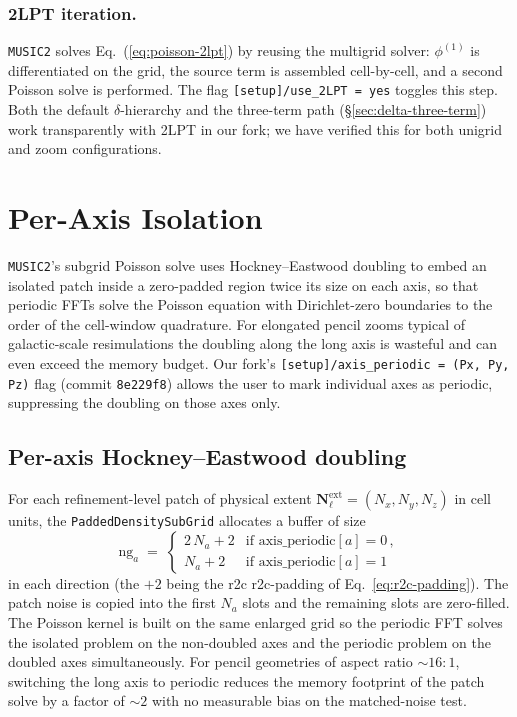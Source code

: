 \documentclass[12pt]{article}
\newcommand{\bN}{\mathbf{N}}
\newcommand{\code}[1]{\texttt{#1}}
\begin{document}
\subsubsection*{2LPT iteration.}
\texttt{MUSIC2} solves Eq.~(\ref{eq:poisson-2lpt}) by reusing the
multigrid solver: $\phi^{(1)}$ is differentiated on the grid, the
source term is assembled cell-by-cell, and a second Poisson solve
is performed.  The flag \code{[setup]/use\_2LPT = yes} toggles this
step.  Both the default $\delta$-hierarchy and the three-term path
(\S\ref{sec:delta-three-term}) work transparently with 2LPT in our
fork; we have verified this for both unigrid and zoom configurations.

\section{Per-Axis Isolation}
\label{sec:peraxis}

\texttt{MUSIC2}'s subgrid Poisson solve uses Hockney--Eastwood
doubling \citep{HockneyEastwood1988} to embed an isolated patch
inside a zero-padded region twice its size on each axis, so that
periodic FFTs solve the Poisson equation with Dirichlet-zero
boundaries to the order of the cell-window quadrature.  For
elongated pencil zooms typical of galactic-scale resimulations the
doubling along the long axis is wasteful and can even exceed the
memory budget.  Our fork's
\code{[setup]/axis\_periodic = (Px, Py, Pz)} flag (commit
\texttt{8e229f8}) allows the user to mark individual axes as
periodic, suppressing the doubling on those axes only.

\subsection{Per-axis Hockney--Eastwood doubling}
\label{sec:peraxis-doubling}

For each refinement-level patch of physical extent
$\bN^\mathrm{ext}_\ell = (N_x, N_y, N_z)$ in cell units, the
\code{PaddedDensitySubGrid} allocates a buffer of size
\begin{equation}
  \mathrm{ng}_a \;=\; \begin{cases}
                       2\,N_a + 2 & \text{if } \mathrm{axis\_periodic}[a] = 0\,, \\
                       N_a + 2    & \text{if } \mathrm{axis\_periodic}[a] = 1
                     \end{cases}
  \label{eq:axis-pad}
\end{equation}
in each direction (the $+2$ being the r2c r2c-padding of
Eq.~\ref{eq:r2c-padding}).  The patch noise is copied into the
first $N_a$ slots and the remaining slots are zero-filled.  The
Poisson kernel is built on the same enlarged grid so the periodic
FFT solves the isolated problem on the non-doubled axes and the
periodic problem on the doubled axes simultaneously.  For pencil
geometries of aspect ratio $\sim 16:1$, switching the long axis to
periodic reduces the memory footprint of the patch solve by a
factor of $\sim 2$ with no measurable bias on the matched-noise
test.
\end{document}
